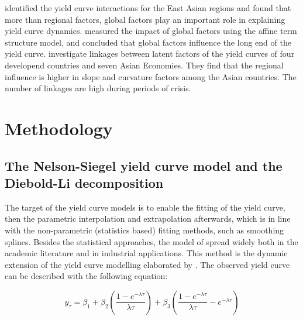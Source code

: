 \documentclass[12pt,bibliography=totoc]{article}
\begin{document}
\cite{bae2011global}  identified the yield curve interactions for the East Asian regions and found that more than regional factors, global factors play an important role in explaining yield curve dynamics. 
\cite{abbritti2013global} measured the impact of global factors using the affine term structure model, and concluded that global factors influence the long end of the yield curve. 
\cite{sowmya2016linkages} investigate linkages between latent factors of the yield curves of four developend countries and seven Asian Economies. They find that the regional influence is higher in slope and curvature factors among the Asian countries. The number of linkages
are high during periods of crisis. 

\newpage 

\section{Methodology}
\noindent
\subsection{The Nelson-Siegel yield curve model and the Diebold-Li decomposition}


The target of the yield curve models is to enable the fitting of the yield curve, then the parametric interpolation and extrapolation afterwards, which is in line with the non-parametric (statistics based) fitting methods, such as smoothing splines.
Besides the statistical approaches, the model of \cite{diebold2006forecasting} spread widely both in the academic literature and in industrial applications. This method is the dynamic extension of the yield curve modelling elaborated by \cite{nelson1987parsimonious}. The observed yield curve can be described with the following equation:

\begin{equation}
y_{\tau}=\beta_{1}+\beta_{2}\left ( \frac{1-e^{-\lambda\tau}}{\lambda\tau} \right )+\beta_{3}\left ( \frac{1-e^{-\lambda\tau}}{\lambda\tau} -e^{-\lambda\tau}\right )
\end{equation}
\end{document}
